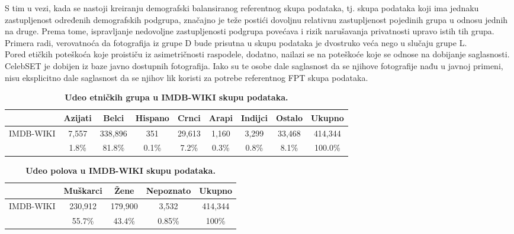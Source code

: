 \documentclass[11pt, a4paper]{article}
\begin{document}
\indent S tim u vezi, kada se nastoji kreiranju demografski balansiranog referentnog skupa podataka, tj. skupa podataka koji ima jednaku zastupljenost određenih demografskih podgrupa, značajno je teže postići dovoljnu relativnu zastupljenost pojedinih grupa u odnosu jednih na druge. Prema tome, ispravljanje nedovoljne zastupljenosti podgrupa povećava i rizik narušavanja privatnosti upravo istih tih grupa. Primera radi, verovatnoća da fotografija iz grupe D bude prisutna u skupu podataka je dvostruko veća nego u slučaju grupe L. \\
\indent Pored etičkih poteškoća koje proističu iz asimetričnosti raspodele, dodatno, nailazi se na poteškoće koje se odnose na dobijanje saglasnosti. CelebSET je dobijen iz baze javno dostupnih fotografija. Iako su te osobe dale saglasnost da se njihove fotografije nađu u javnoj primeni, nisu eksplicitno dale saglasnost da se njihov lik koristi za potrebe referentnog FPT skupa podataka.

\begin{table}[h!]
	\centering
	\caption{\textbf{Udeo etničkih grupa u IMDB-WIKI skupu podataka.}}
	\begin{tabular}{c|cccccccc} \toprule
		{} & {Azijati} & {Belci} & {Hispano} & {Crnci} & {Arapi} & {Indijci} & {Ostalo} & {Ukupno} \\ \midrule
		{IMDB-WIKI} & 7,557 & 338,896 & 351 & 29,613 & 1,160 & 3,299 & 33,468 & 414,344 \\
		{} & 1.8\% & 81.8\% & 0.1\% & 7.2\% & 0.3\% & 0.8\% & 8.1\% & 100.0\% \\ \bottomrule
	\end{tabular}
	\label{table:ethnicity-imdb-wiki}
\end{table}

\begin{table}[h!]
	\centering
	\caption{\textbf{Udeo polova u IMDB-WIKI skupu podataka.}}
	\begin{tabular}{ccccc} \toprule
		{} & {Muškarci} & {Žene} & {Nepoznato} & {Ukupno} \\ \midrule
		{IMDB-WIKI} & 230,912 & 179,900 & 3,532 & 414,344 \\
		{} & 55.7\% & 43.4\% & 0.85\% & 100\% \\ \bottomrule
	\end{tabular}
	\label{table:gender-imdb-wiki}
\end{table}
\end{document}
